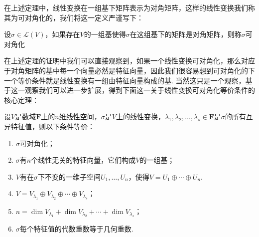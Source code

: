 在上述定理中，线性变换在一组基下矩阵表示为对角矩阵，这样的线性变换我们称其为可对角化的，我们将这一定义严谨写下：
\begin{definition}
    设$\sigma\in\mathcal{L}(V)$，如果存在$V$的一组基使得$\sigma$在这组基下的矩阵是对角矩阵，则称$\sigma$可对角化
\end{definition}

在上述定理的证明中我们可以直接观察到，如果一个线性变换可对角化，那么对应于对角矩阵的基中每一个向量必然是特征向量，因此我们很容易想到可对角化的下一个等价条件就是线性变换有一组由特征向量构成的基. 当然这只是一个观察，基于这一观察我们可以进一步扩展，得到下面这一关于线性变换可对角化等价条件的核心定理：
\begin{theorem} \label{thm:16:可对角化条件}
    设$V$是数域$\mathbf{F}$上的$n$维线性空间，$\sigma$是$V$上的线性变换，$\lambda_1,\lambda_2,\ldots,\lambda_s\in\mathbf{F}$是$\sigma$的所有互异特征值，则以下条件等价：
    \begin{enumerate}
        \item \label{item:16:可对角化条件:1}
              $\sigma$可对角化；

        \item \label{item:16:可对角化条件:2}
              $\sigma$有$n$个线性无关的特征向量，它们构成$V$的一组基；

        \item \label{item:16:可对角化条件:3}
              $V$有在$\sigma$下不变的一维子空间$U_1,\ldots,U_n$，使得$V=U_1\oplus\cdots\oplus U_n$.

        \item \label{item:16:可对角化条件:4}
              $V=V_{\lambda_1}\oplus V_{\lambda_2}\oplus\cdots\oplus V_{\lambda_s}$；

        \item \label{item:16:可对角化条件:5}
              $n=\dim V_{\lambda_1}+\dim V_{\lambda_2}+\cdots+\dim V_{\lambda_s}$；

        \item \label{item:16:可对角化条件:6}
              $\sigma$每个特征值的代数重数等于几何重数.
    \end{enumerate}
\end{theorem}

